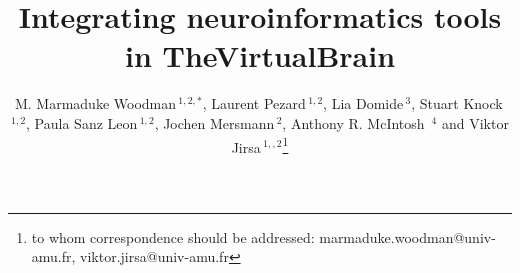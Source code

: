 \documentclass{bioinfo}
\begin{document}


\title[The Virtual Brain]{Integrating neuroinformatics tools in TheVirtualBrain}
\author[Woodman {et~al}]{
        M. Marmaduke Woodman\,$^{1,2,*}$,  
        Laurent Pezard\,$^{1,2}$,  
        Lia Domide\,$^{3}$, 
        Stuart Knock\,$^{1,2}$, 
        Paula Sanz Leon\,$^{1,2}$, 
        Jochen Mersmann\,$^{2}$,
        Anthony R. McIntosh \,$^{4}$ and  
        Viktor Jirsa\,$^{1,,2}$\footnote{to whom correspondence should be addressed: marmaduke.woodman@univ-amu.fr,
        viktor.jirsa@univ-amu.fr}}

\address{$^{1}$ Institut National de la Sant\'{e} et de la Recherche M\'{e}dicale UMR 1106, Institut de Neurosciences des Syst\`{e}mes, 13385 Marseille, France.\\
	 $^{2}$ Aix-Marseille Universit\'{e}, 13005 Marseille, France.\\
         $^{3}$ CodeBox GmbH, Hugo Eckener Str. 7, 70184 Stuttgart, Germany.\\
         $^{4}$ Codemart, 13, Petofi Sandor, 400610, Cluj-Napoca, Romania.\\
         $^{5}$ Rotman Research Institute at Baycrest, Toronto, M6A 2E1, Ontario, Canada\\
        }

\history{}

\editor{}

\maketitle
\end{document}
